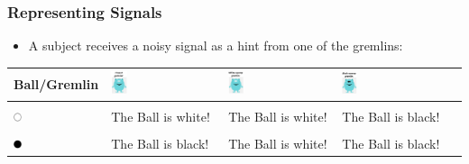 \documentclass[11pt,hyperref={bookmarks=false}]{beamer}
\begin{document}
\begin{frame}
\frametitle{Representing Signals}
\begin{itemize}
\item A subject receives a noisy signal as a hint from one of the gremlins:
\end{itemize}
\begin{center}

\small
\begin{tabular}{l|C|C|C|C}
\hline
Ball/Gremlin & \includegraphics[width=0.15\textwidth]{Instructions/honest.png} &  \includegraphics[width=0.15\textwidth]{Instructions/whiteswamp.png} &  \includegraphics[width=0.15\textwidth]{Instructions/blackswamp.png} \\
 \hline
  &  & &  \\
\includegraphics[width=0.1\textwidth]{Instructions/whiteball.png}  & The Ball is white! \vspace{10pt} &The Ball is white! \vspace{10pt} & The Ball is black! \vspace{10pt}\\
\hline
  &  & &  \\
\includegraphics[width=0.1\textwidth]{Instructions/blackball.png}  & The Ball is black! \vspace{10pt} & The Ball is white! \vspace{10pt}& The Ball is black! \vspace{10pt} \\
\hline
\end{tabular}
\end{center}
\end{frame}
\end{document}
